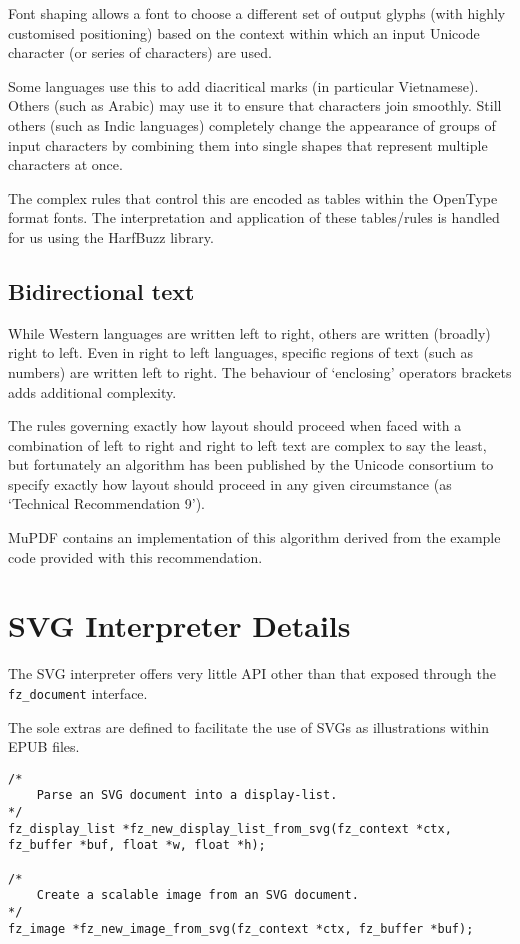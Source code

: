 \documentclass[oneside]{book}
\begin{document}
Font shaping allows a font to choose a different set of output glyphs (with highly customised positioning) based on the context within which an input Unicode character (or series of characters) are used.

Some languages use this to add diacritical marks (in particular Vietnamese). Others (such as Arabic) may use it to ensure that characters join smoothly. Still others (such as Indic languages) completely change the appearance of groups of input characters by combining them into single shapes that represent multiple characters at once.

The complex rules that control this are encoded as tables within the OpenType format fonts. The interpretation and application of these tables/rules is handled for us using the HarfBuzz library. 

\section{Bidirectional text}

While Western languages are written left to right, others are written (broadly) right to left. Even in right to left languages, specific regions of text (such as numbers) are written left to right. The behaviour of `enclosing' operators brackets adds additional complexity. 

The rules governing exactly how layout should proceed when faced with a combination of left to right and right to left text are complex to say the least, but fortunately an algorithm has been published by the Unicode consortium to specify exactly how layout should proceed in any given circumstance (as `Technical Recommendation 9').

MuPDF contains an implementation of this algorithm derived from the example code provided with this recommendation.

\chapter{SVG Interpreter Details}
\label{SVGInterpreter}

The SVG interpreter offers very little API other than that exposed through the \texttt{fz\_document} interface.

The sole extras are defined to facilitate the use of SVGs as illustrations within EPUB files.

\begin{lstlisting}
/*
	Parse an SVG document into a display-list.
*/
fz_display_list *fz_new_display_list_from_svg(fz_context *ctx, fz_buffer *buf, float *w, float *h);

/*
	Create a scalable image from an SVG document.
*/
fz_image *fz_new_image_from_svg(fz_context *ctx, fz_buffer *buf);
\end{lstlisting}
\end{document}
